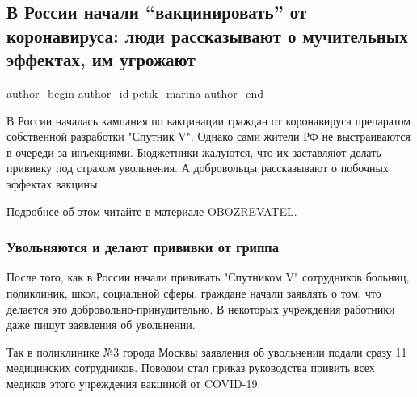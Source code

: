  
 
 
 
 
 
\subsection{В России начали \enquote{вакцинировать} от коронавируса: люди рассказывают о мучительных эффектах, им угрожают}
\label{sec:18_12_2020.news.ua.obozrevatel.petik_marina.1.russia_vaccine_view_from_ukraine}
\ifcmt
	author_begin
   author_id petik_marina
	author_end
\fi

В России началась кампания по вакцинации граждан от коронавируса препаратом
собственной разработки "Спутник V". Однако сами жители РФ не выстраиваются в
очереди за инъекциями. Бюджетники жалуются, что их заставляют делать прививку
под страхом увольнения. А добровольцы рассказывают о побочных эффектах вакцины.

Подробнее об этом читайте в материале OBOZREVATEL.

\subsubsection{Увольняются и делают прививки от гриппа}

После того, как в России начали прививать "Спутником V" сотрудников больниц,
поликлиник, школ, социальной сферы, граждане начали заявлять о том, что
делается это добровольно-принудительно. В некоторых учреждения работники даже
пишут заявления об увольнении.

Так в поликлинике №3 города Москвы заявления об увольнении подали сразу 11
медицинских сотрудников. Поводом стал приказ руководства привить всех медиков
этого учреждения вакциной от COVID-19.

